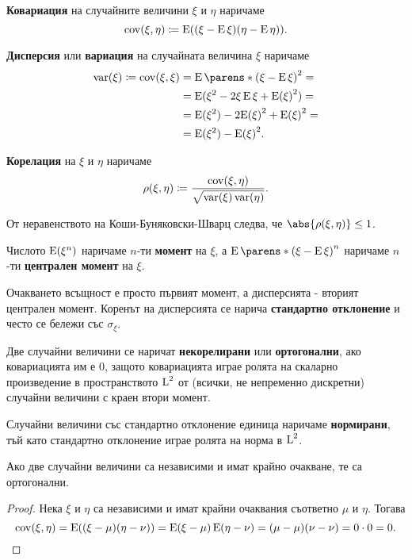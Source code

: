 \documentclass{../../common/topic}
\begin{document}
\begin{definition}
  \textbf{Ковариация} на случайните величини \( \xi \) и \( \eta \) наричаме
  \begin{equation*}
    \operatorname{cov}(\xi, \eta)
    \coloneqq
    \operatorname{E}((\xi - \operatorname{E} \xi) (\eta - \operatorname{E} \eta)).
  \end{equation*}

  \textbf{Дисперсия} или \textbf{вариация} на случайната величина \( \xi \) наричаме
  \begin{align*}
    \var(\xi)
    \coloneqq
    \cov(\xi, \xi)
    &=
    \Expect \parens*{{(\xi - \Expect \xi)}^2 }
    = \\ &=
    \Expect(\xi^2 - 2 \xi \Expect \xi + {\Expect(\xi)}^2)
    = \\ &=
    \Expect(\xi^2) - 2 {\Expect(\xi)}^2 + {\Expect(\xi)}^2
    = \\ &=
    \Expect(\xi^2) - {\Expect(\xi)}^2.
  \end{align*}

  \textbf{Корелация} на \( \xi \) и \( \eta \) наричаме
  \begin{equation*}
    \operatorname{\rho}(\xi, \eta)
    \coloneqq
    \frac {\operatorname{cov}(\xi, \eta)} {\sqrt{\operatorname{var}(\xi) \operatorname{var}(\eta)}}.
  \end{equation*}

  От неравенството на Коши-Буняковски-Шварц следва, че \( \abs{\corr(\xi, \eta)} \leq 1 \).

  Числото \( \operatorname{E}(\xi^n) \) наричаме \( n \)-ти \textbf{момент} на \( \xi \), а \( \Expect \parens*{ {(\xi - \Expect \xi)}^n } \) наричаме \( n \)-ти \textbf{централен момент} на \( \xi \).

  Очакването всъщност е просто първият момент, а дисперсията - вторият централен момент. Коренът на дисперсията се нарича \textbf{стандартно отклонение} и често се бележи със \( \sigma_\xi \).

  Две случайни величини се наричат \textbf{некорелирани} или \textbf{ортогонални}, ако ковариацията им е \( 0 \), защото ковариацията играе ролята на скаларно произведение в пространството \( \operatorname{L}^2 \) от (всички, не непременно дискретни) случайни величини с краен втори момент.

  Случайни величини със стандартно отклонение единица наричаме \textbf{нормирани}, тъй като стандартно отклонение играе ролята на норма в \( \operatorname{L}^2 \).
\end{definition}

\begin{proposition}\label{thm:independence_implies_orthogonality}
  Ако две случайни величини са независими и имат крайно очакване, те са ортогонални.
\end{proposition}
\begin{proof}
  Нека \( \xi \) и \( \eta \) са независими и имат крайни очаквания съответно \( \mu \) и \( \eta \). Тогава
  \begin{equation*}
    \operatorname{cov}(\xi, \eta)
    =
    \operatorname{E}((\xi - \mu) (\eta - \nu))
    =
    \operatorname{E}(\xi - \mu) \operatorname{E}(\eta - \nu)
    =
    (\mu - \mu) (\nu - \nu)
    =
    0 \cdot 0
    =
    0.
  \end{equation*}
\end{proof}
\end{document}
